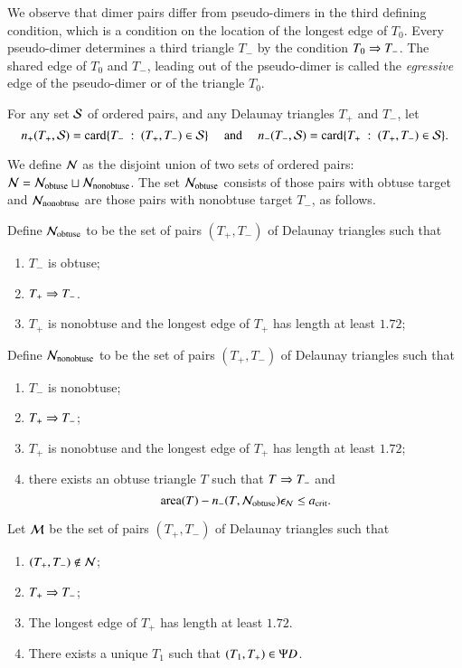 We observe that dimer pairs differ from pseudo-dimers in the third
defining condition, which is a condition on the location of the
longest edge of $T_0$.  Every pseudo-dimer determines a third triangle
$T_-$ by the condition $T_0\Ra T_-$.  The shared edge of $T_0$ and
$T_-$, leading out of the pseudo-dimer is called the {\it egressive} edge of
the pseudo-dimer or of the triangle $T_0$.

For any set $\S$ of ordered pairs, and any Delaunay triangles $T_+$ and $T_-$,
let 
\[
n_+(T_+,\S) = \card \{T_-\mid (T_+,T_-)\in \S\}
\quad\text{ and }\quad
n_-(T_-,\S)
= \card \{T_+\mid (T_+,T_-)\in \S\}.
\]

We define $\N$ as the disjoint union of two sets of ordered pairs: $\N
= \N_{\text{obtuse}} \sqcup \N_{\text{nonobtuse}}$.  The set
$\N_{\text{obtuse}}$ consists of those pairs with obtuse target and
$\N_{\text{nonobtuse}}$ are those pairs with nonobtuse target $T_-$,
as follows.

Define $\N_{\text{obtuse}}$ to be the set of pairs $(T_+,T_-)$ of
Delaunay triangles such that
\begin{enumerate}
\item $T_-$ is obtuse;
\item $T_+\Ra T_-$.
\item $T_+$ is nonobtuse and the longest edge of $T_+$ has length at
  least $1.72$;
\end{enumerate}

Define  $\N_{\text{nonobtuse}}$ to 
be the set of pairs $(T_+,T_-)$ of Delaunay triangles such that
\begin{enumerate}
\item $T_-$ is nonobtuse;
\item $T_+\Ra T_-$;
\item $T_+$ is nonobtuse and the longest edge of $T_+$ has length at
  least $1.72$;
\item there exists an obtuse triangle $T$ such that $T\Ra T_-$ and 
\[
\area(T) -   n_-(T,\N_{\text{obtuse}})\epsN\le \acrit.
\]
\end{enumerate}

Let $\M$ be the set of pairs $(T_+,T_-)$ of Delaunay triangles such that
\begin{enumerate}
\item $(T_+,T_-)\not\in \N$;
\item $T_+\Ra T_-$;
\item The longest edge of $T_+$ has length  at least $1.72$.
\item There exists a unique $T_1$ such that $(T_1,T_+)\in \PD$.
\end{enumerate}

